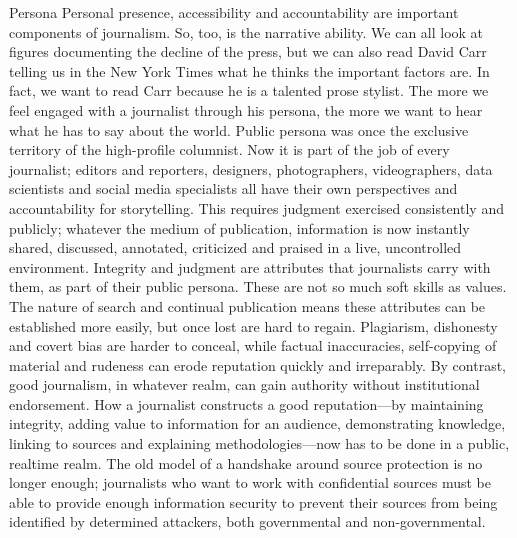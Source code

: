 Persona
Personal presence, accessibility and accountability are important components of
journalism. So, too, is the narrative ability. We can all look at figures documenting
the decline of the press, but we can also read David Carr telling us in the
New York Times what he thinks the important factors are. In fact, we want to
read Carr because he is a talented prose stylist. The more we feel engaged with
a journalist through his persona, the more we want to hear what he has to say
about the world.
Public persona was once the exclusive territory of the high-profile columnist.
Now it is part of the job of every journalist; editors and reporters, designers,
photographers, videographers, data scientists and social media specialists all have
their own perspectives and accountability for storytelling. This requires judgment
exercised consistently and publicly; whatever the medium of publication, information
is now instantly shared, discussed, annotated, criticized and praised in a
live, uncontrolled environment.
Integrity and judgment are attributes that journalists carry with them, as part of
their public persona. These are not so much soft skills as values. The nature of
search and continual publication means these attributes can be established more
easily, but once lost are hard to regain. Plagiarism, dishonesty and covert bias are
harder to conceal, while factual inaccuracies, self-copying of material and rudeness
can erode reputation quickly and irreparably. By contrast, good journalism,
in whatever realm, can gain authority without institutional endorsement.
How a journalist constructs a good reputation—by maintaining integrity, adding
value to information for an audience, demonstrating knowledge, linking to
sources and explaining methodologies—now has to be done in a public, realtime
realm. The old model of a handshake around source protection is no longer
enough; journalists who want to work with confidential sources must be able to
provide enough information security to prevent their sources from being identified
by determined attackers, both governmental and non-governmental.

